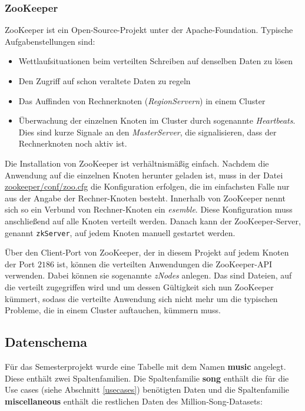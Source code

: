 \subsubsection{ZooKeeper}\label{zook}
ZooKeeper ist ein Open-Source-Projekt unter der Apache-Foundation. Typische Aufgabenstellungen sind:
\begin{itemize}
\item Wettlaufsituationen beim verteilten Schreiben auf denselben Daten zu lösen
\item Den Zugriff auf schon veraltete Daten zu regeln 
\item Das Auffinden von Rechnerknoten (\textit{RegionServern}) in einem Cluster
\item Überwachung der einzelnen Knoten im Cluster durch sogenannte \textit{Heartbeats}. Dies sind kurze Signale an den  \textit{MasterServer}, die signalisieren, dass der Rechnerknoten noch aktiv ist. 
\end{itemize}

Die Installation von ZooKeeper ist verhältnismäßig einfach. Nachdem die Anwendung auf die einzelnen Knoten herunter geladen ist, muss in der Datei \url{zookeeper/conf/zoo.cfg}
die Konfiguration erfolgen, die im einfachsten Falle nur aus der Angabe der Rechner-Knoten besteht. Innerhalb von ZooKeeper nennt sich so ein Verbund
von Rechner-Knoten ein \textit{esemble}. Diese Konfiguration muss anschließend auf alle Knoten verteilt werden. Danach kann der ZooKeeper-Server, genannt \texttt{zkServer},
auf jedem Knoten manuell gestartet werden. 

Über den Client-Port von ZooKeeper, der in diesem Projekt auf jedem Knoten der Port $2186$ ist, können die verteilten
Anwendungen die ZooKeeper-API verwenden. Dabei können sie sogenannte \textit{zNodes} anlegen. Das sind Dateien, auf die verteilt zugegriffen wird und um dessen
Gültigkeit sich nun ZooKeeper kümmert, sodass die verteilte Anwendung sich nicht mehr um die typischen Probleme, die in einem Cluster auftauchen, kümmern muss.


\subsection{Datenschema}\label{hbase_datenschema}
Für das Semesterprojekt wurde eine Tabelle mit dem Namen \textbf{music} angelegt. Diese enthält zwei Spaltenfamilien. Die Spaltenfamilie \textbf{song} enthält die für die Use cases (siehe Abschnitt \ref{usecases}) benötigten Daten und die Spaltenfamilie
\textbf{miscellaneous} enthält die restlichen Daten des Million-Song-Datasets:

